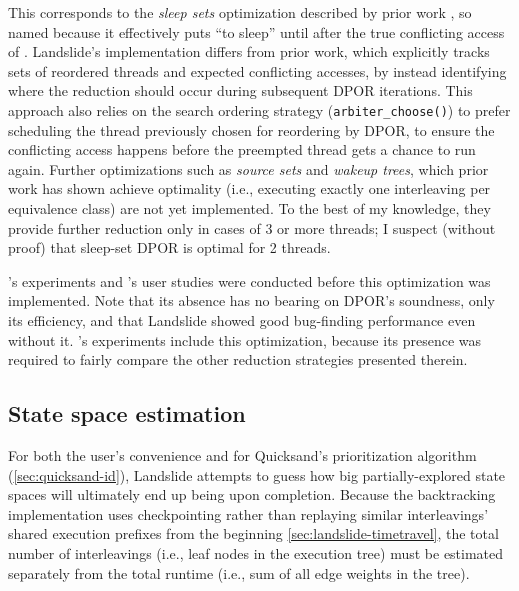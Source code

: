 This corresponds to the {\em sleep sets} optimization described by prior work \cite{partial-order-methods,dpor,optimal-dpor},
so named because it effectively puts 
``to sleep'' until after the true conflicting access of .
Landslide's implementation differs from prior work,
which explicitly tracks sets of reordered threads and expected conflicting accesses,
by instead identifying
where the reduction should occur
during subsequent DPOR iterations.
This approach also relies on the search ordering strategy ({\tt arbiter\_choose()})
to prefer scheduling the thread previously chosen for reordering by DPOR,
to ensure the conflicting access happens before the preempted thread gets a chance to run again.
Further optimizations such as {\em source sets} and {\em wakeup trees},
which prior work has shown achieve optimality
(i.e., executing exactly one interleaving per equivalence class) \cite{optimal-dpor}
are not yet implemented.
To the best of my knowledge,
they provide further reduction only in cases of 3 or more threads;
I suspect (without proof) that sleep-set DPOR is optimal for 2 threads.

's experiments and 's user studies
were conducted before this optimization was implemented.
Note that its absence has no bearing on DPOR's soundness, only its efficiency,
and that Landslide showed good bug-finding performance even without it.
's experiments include this optimization,
because its presence was required to fairly compare the other reduction strategies presented therein.


\subsection{State space estimation}
\label{sec:landslide-estimate}

For both the user's convenience and for Quicksand's prioritization algorithm (\cref{sec:quicksand-id}),
Landslide attempts to guess how big partially-explored state spaces will ultimately end up being upon completion.
Because the backtracking implementation uses checkpointing
rather than replaying similar interleavings' shared execution prefixes from the beginning \cref{sec:landslide-timetravel},
the total number of interleavings (i.e., leaf nodes in the execution tree)
must be estimated separately from the total runtime (i.e., sum of all edge weights in the tree).

